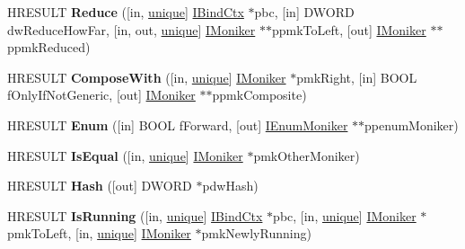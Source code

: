 \begin{DoxyCompactItemize}
\item 
\mbox{\label{interface_i_moniker_a5d508da1e365db6ceefdaf1afcae55df}} 
H\+R\+E\+S\+U\+LT {\bfseries Reduce} (\mbox{[}in, \hyperlink{interfaceunique}{unique}\mbox{]} \hyperlink{interface_i_bind_ctx}{I\+Bind\+Ctx} $\ast$pbc, \mbox{[}in\mbox{]} D\+W\+O\+RD dw\+Reduce\+How\+Far, \mbox{[}in, out, \hyperlink{interfaceunique}{unique}\mbox{]} \hyperlink{interface_i_moniker}{I\+Moniker} $\ast$$\ast$ppmk\+To\+Left, \mbox{[}out\mbox{]} \hyperlink{interface_i_moniker}{I\+Moniker} $\ast$$\ast$ppmk\+Reduced)
\item 
\mbox{\label{interface_i_moniker_a131053015d0037ac8d22dd9aae6a5293}} 
H\+R\+E\+S\+U\+LT {\bfseries Compose\+With} (\mbox{[}in, \hyperlink{interfaceunique}{unique}\mbox{]} \hyperlink{interface_i_moniker}{I\+Moniker} $\ast$pmk\+Right, \mbox{[}in\mbox{]} B\+O\+OL f\+Only\+If\+Not\+Generic, \mbox{[}out\mbox{]} \hyperlink{interface_i_moniker}{I\+Moniker} $\ast$$\ast$ppmk\+Composite)
\item 
\mbox{\label{interface_i_moniker_abaf46de07becfd0cda59c3f580fcda93}} 
H\+R\+E\+S\+U\+LT {\bfseries Enum} (\mbox{[}in\mbox{]} B\+O\+OL f\+Forward, \mbox{[}out\mbox{]} \hyperlink{interface_i_enum_moniker}{I\+Enum\+Moniker} $\ast$$\ast$ppenum\+Moniker)
\item 
\mbox{\label{interface_i_moniker_a2d095942c83d83a8397e8b8fb15b3e85}} 
H\+R\+E\+S\+U\+LT {\bfseries Is\+Equal} (\mbox{[}in, \hyperlink{interfaceunique}{unique}\mbox{]} \hyperlink{interface_i_moniker}{I\+Moniker} $\ast$pmk\+Other\+Moniker)
\item 
\mbox{\label{interface_i_moniker_aa30d145ac064a6ea321362c998990016}} 
H\+R\+E\+S\+U\+LT {\bfseries Hash} (\mbox{[}out\mbox{]} D\+W\+O\+RD $\ast$pdw\+Hash)
\item 
\mbox{\label{interface_i_moniker_ae2c15951e6a52f15ff2e8b8f110baaec}} 
H\+R\+E\+S\+U\+LT {\bfseries Is\+Running} (\mbox{[}in, \hyperlink{interfaceunique}{unique}\mbox{]} \hyperlink{interface_i_bind_ctx}{I\+Bind\+Ctx} $\ast$pbc, \mbox{[}in, \hyperlink{interfaceunique}{unique}\mbox{]} \hyperlink{interface_i_moniker}{I\+Moniker} $\ast$pmk\+To\+Left, \mbox{[}in, \hyperlink{interfaceunique}{unique}\mbox{]} \hyperlink{interface_i_moniker}{I\+Moniker} $\ast$pmk\+Newly\+Running)

\end{DoxyCompactItemize}
